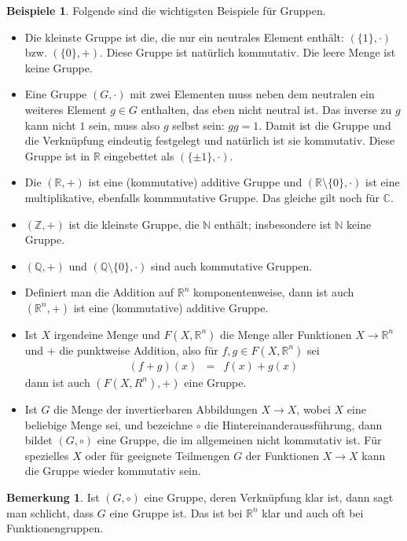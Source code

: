 \documentclass[index=totoc]{scrartcl}%
\theoremstyle{definition}
\newtheorem{bem}[defi]{Bemerkung}
\newtheorem{bspe}[defi]{Beispiele}
\newcommand{\N}{\mathbb N}
\newcommand{\Z}{\mathbb Z}
\newcommand{\Q}{\mathbb Q}
\newcommand{\R}{\mathbb R}
\newcommand{\C}{\mathbb C}
\begin{document}
\begin{bspe}
  Folgende sind die wichtigsten Beispiele für Gruppen. 
  \begin{itemize}
  \item
    Die kleinste Gruppe ist die, die nur ein neutrales Element enthält:
    $(\{1\}, \cdot)$ bzw. $(\{0\}, +)$.
    Diese Gruppe ist natürlich kommutativ.
    Die leere Menge ist keine Gruppe. 
  \item
    Eine Gruppe  $(G, \cdot)$ mit zwei Elementen muss neben dem neutralen
    ein weiteres Element $g\in G$ enthalten, das eben nicht neutral ist.
    Das inverse zu $g$ kann nicht $1$ sein, muss also $g$ selbst sein:
    $gg=1$.
    Damit ist die Gruppe und die Verknüpfung eindeutig festgelegt
    und natürlich ist sie kommutativ.
    Diese Gruppe ist in $\R$ eingebettet als $(\{\pm1\},\cdot)$. 
  \item
    Die $(\R,+)$ ist eine (kommutative) additive Gruppe und
    $(\R\setminus\{0\},\cdot)$ ist eine multiplikative,
    ebenfalls kommmutative Gruppe.
    Das gleiche gilt noch für $\C$.
  \item
    $(\Z,+)$ ist die kleinste Gruppe, die $\N$ enthält;
    insbesondere ist $\N$ keine Gruppe. 
  \item
    $(\Q,+)$ und $(\Q\setminus\{0\}, \cdot)$ sind auch kommutative Gruppen.
  \item
    Definiert man die Addition auf $\R^n$ komponentenweise,
    dann ist auch  $(\R^n,+)$ ist eine (kommutative) additive Gruppe. 
  \item
    Ist $X$ irgendeine Menge und
    $F(X,\R^n)$ die Menge aller Funktionen $X\to\R^n$
    und $+$ die punktweise Addition, also für $f,g\in F(X,\R^n)$ sei
    \begin{eqnarray*}
      (f+g)(x)&=&f(x)+g(x)
    \end{eqnarray*}
    dann ist auch $(F(X, R^n), +)$ eine Gruppe. 
  \item
    Ist $G$ die Menge der invertierbaren Abbildungen $X\to X$,
    wobei $X$ eine beliebige Menge sei, und bezeichne $\circ$
    die Hintereinanderaussführung,
    dann bildet $(G, \circ)$ eine Gruppe,
    die im allgemeinen nicht kommutativ ist. 
    Für spezielles $X$ oder für geeignete Teilmengen $G$
    der Funktionen $X\to X$ kann die Gruppe wieder kommutativ sein. 
  \end{itemize}
\end{bspe}



\begin{bem}
  Ist $(G, \circ)$ eine Gruppe, deren Verknüpfung klar ist,
  dann sagt man schlicht, dass $G$ eine Gruppe ist.
  Das ist bei $\R^n$ klar und auch oft bei Funktionengruppen. 
\end{bem}
\end{document}
